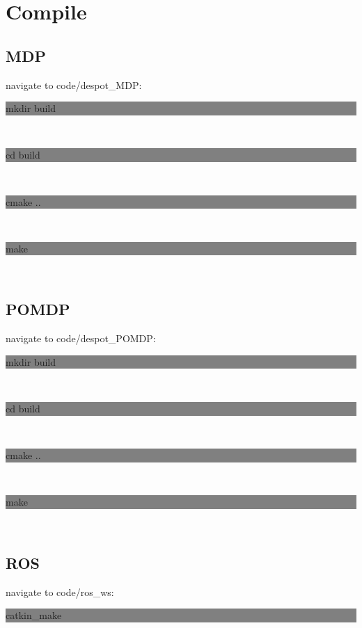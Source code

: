\section{Compile}

\subsection{MDP}
navigate to code/despot\_MDP:\\
\colorbox{gray}{\begin{minipage}{\linewidth} mkdir build \end{minipage}}\\
\colorbox{gray}{\begin{minipage}{\linewidth} cd build \end{minipage}}\\
\colorbox{gray}{\begin{minipage}{\linewidth} cmake .. \end{minipage}}\\
\colorbox{gray}{\begin{minipage}{\linewidth} make \end{minipage}}\\

\subsection{POMDP}
navigate to code/despot\_POMDP:\\
\colorbox{gray}{\begin{minipage}{\linewidth} mkdir build \end{minipage}}\\
\colorbox{gray}{\begin{minipage}{\linewidth} cd build \end{minipage}}\\
\colorbox{gray}{\begin{minipage}{\linewidth} cmake .. \end{minipage}}\\
\colorbox{gray}{\begin{minipage}{\linewidth} make \end{minipage}}\\

\subsection{ROS}
navigate to code/ros\_ws:\\
\colorbox{gray}{\begin{minipage}{\linewidth} catkin\_make \end{minipage}}\\


